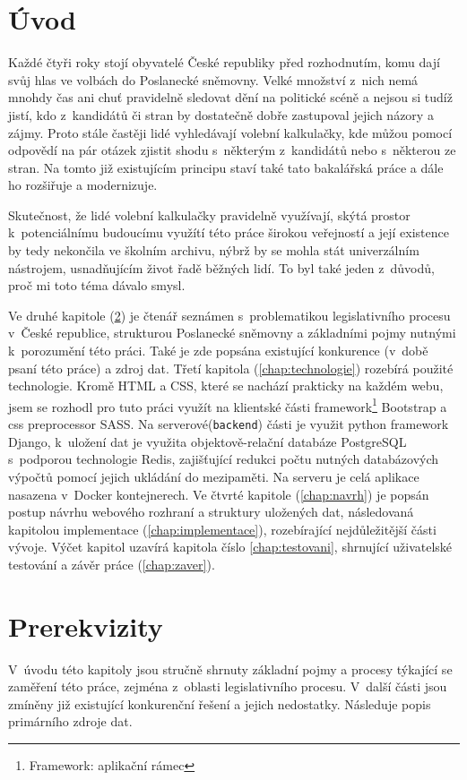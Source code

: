 
\chapter{Úvod}
Každé čtyři roky stojí obyvatelé České republiky před rozhodnutím, komu dají svůj hlas ve volbách do Poslanecké sněmovny. Velké množství z~nich nemá mnohdy čas ani chuť pravidelně sledovat dění na politické scéně a nejsou si tudíž jistí, kdo z~kandidátů či stran by dostatečně dobře zastupoval jejich názory a zájmy. Proto stále častěji lidé vyhledávají volební kalkulačky, kde můžou pomocí odpovědí na pár otázek zjistit shodu s~některým z~kandidátů nebo s~některou ze stran. Na tomto již existujícím principu staví také tato bakalářská práce a dále ho rozšiřuje a modernizuje. 
\par Skutečnost, že lidé volební kalkulačky pravidelně využívají, skýtá prostor k~potenciálnímu budoucímu využítí této práce širokou veřejností a její existence by tedy nekončila ve školním archivu, nýbrž by se mohla stát univerzálním nástrojem, usnadňujícím život řadě běžných lidí. To byl také jeden z~důvodů, proč mi toto téma dávalo smysl.
\par Ve druhé kapitole (\ref{chap:Prerekvizity}) je čtenář seznámen s~problematikou legislativního procesu v~České republice, strukturou Poslanecké sněmovny a základními pojmy nutnými k~porozumění této práci. Také je zde popsána existující konkurence (v~době psaní této práce) a zdroj dat. Třetí kapitola (\ref{chap:technologie}) rozebírá použité technologie. Kromě HTML a CSS, které se nachází prakticky na každém webu, jsem se rozhodl pro tuto práci využít na klientské části framework\footnote{Framework: aplikační rámec} Bootstrap a css preprocessor SASS. Na serverové(\texttt{backend}) části je využit python framework Django, k~uložení dat je využita objektově-relační databáze PostgreSQL s~podporou technologie Redis, zajišťující redukci počtu nutných databázových výpočtů pomocí jejich ukládání do mezipaměti. Na serveru je celá aplikace nasazena v~Docker kontejnerech.  Ve čtvrté kapitole (\ref{chap:navrh}) je popsán postup návrhu webového rozhraní a struktury uložených dat, následovaná kapitolou implementace (\ref{chap:implementace}), rozebírající nejdůležitější části vývoje. Výčet kapitol uzavírá kapitola číslo \ref{chap:testovani}, shrnující uživatelské testování a závěr práce (\ref{chap:zaver}).



\chapter{Prerekvizity}
\label{chap:Prerekvizity}
V~úvodu této kapitoly jsou stručně shrnuty základní pojmy a procesy týkající se zaměření této práce, zejména z~oblasti legislativního procesu. V~další části jsou zmíněny již existující konkurenční řešení a jejich nedostatky. Následuje popis primárního zdroje dat.


